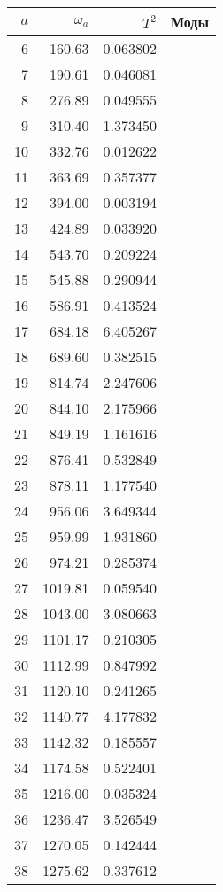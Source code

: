 \begin{tabular}{r|rr|l}
  \toprule
  $a$ &  $\omega_a$ & $T^2$ & Моды \\ 
  \midrule
 6 &      160.63  &  0.063802  & \\
 7 &      190.61  &  0.046081  & \\
 8 &      276.89  &  0.049555  & \\
 9 &      310.40  &  1.373450  & \\
10 &      332.76  &  0.012622  & \\
11 &      363.69  &  0.357377  & \\
12 &      394.00  &  0.003194  & \\
13 &      424.89  &  0.033920  & \\
14 &      543.70  &  0.209224  & \\
15 &      545.88  &  0.290944  & \\
16 &      586.91  &  0.413524  & \\
17 &      684.18  &  6.405267  & \\
18 &      689.60  &  0.382515  & \\
19 &      814.74  &  2.247606  & \\
20 &      844.10  &  2.175966  & \\
21 &      849.19  &  1.161616  & \\
22 &      876.41  &  0.532849  & \\
23 &      878.11  &  1.177540  & \\
24 &      956.06  &  3.649344  & \\
25 &      959.99  &  1.931860  & \\
26 &      974.21  &  0.285374  & \\
27 &     1019.81  &  0.059540  & \\
28 &     1043.00  &  3.080663  & \\
29 &     1101.17  &  0.210305  & \\
30 &     1112.99  &  0.847992  & \\
31 &     1120.10  &  0.241265  & \\
32 &     1140.77  &  4.177832  & \\
33 &     1142.32  &  0.185557  & \\
34 &     1174.58  &  0.522401  & \\
35 &     1216.00  &  0.035324  & \\
36 &     1236.47  &  3.526549  & \\
37 &     1270.05  &  0.142444  & \\
38 &     1275.62  &  0.337612  & \\

\end{tabular}
